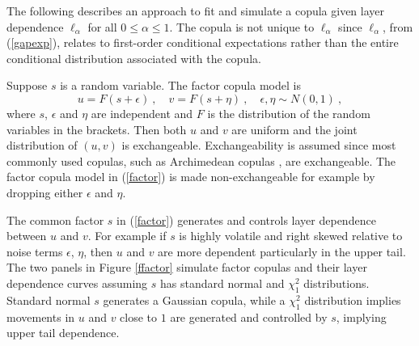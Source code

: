\documentclass[authoryear]{elsarticle}
\newcommand{\eps}{\epsilon}
\newcommand{\cq}{\ ,\quad }
\newcommand{\eref}[1]{(\ref{#1})}
\newcommand{\fref}[1]{Figure \ref{#1}}
\begin{document}
The following describes an approach to fit and simulate a copula given layer dependence $\ell_\alpha$ for all $0\leq\alpha\leq 1$. The copula is not unique to $\ell_\alpha$ since $\ell_\alpha$, from \eref{gapexp}, relates to first-order conditional expectations rather than the entire conditional distribution associated with the copula.


Suppose $s$ is a random variable. The factor copula model is
\begin{equation}\label{factor}
u=F(s+\eps) \cq
v=F(s+\eta)    \cq \eps, \eta \sim N(0,1) \ ,
\end{equation}
where $s$, $\eps$ and $\eta$ are independent and $F$ is the  distribution of the random variables in the brackets. Then both $u$ and $v$ are uniform and the joint distribution of $(u,v)$ is exchangeable. Exchangeability is assumed since most commonly used copulas, such as Archimedean copulas \citep{mcneil2005qrm}, are exchangeable. The factor copula model in \eref{factor} is made non-exchangeable for example by dropping either $\eps$ and $\eta$.

The common factor $s$ in \eref{factor} generates and controls layer dependence between $u$ and $v$. For example if $s$ is highly volatile and right skewed relative to noise terms $\eps$, $\eta$, then $u$ and $v$ are more dependent particularly in the upper tail. The two panels in \fref{ffactor} simulate factor copulas and their layer dependence curves assuming $s$ has standard normal and $\chi^2_1$ distributions. Standard normal $s$ generates a Gaussian copula, while a $\chi^2_1$ distribution implies movements in $u$ and $v$ close to $1$ are generated and controlled by $s$, implying upper tail dependence.
\end{document}
